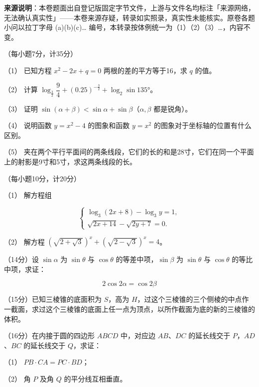 

\begin{gktip}
\textbf{来源说明}：本卷题面出自登记版固定字节文件，上游与文件名均标注「来源网络，无法确认真实性」——本卷来源存疑，转录如实照录，真实性未能核实。原卷各题小问以拉丁字母 (a)(b)(c)… 编号，本转录按体例统一为（1）（2）（3）…，内容不变。
\end{gktip}

\begin{question}
（每小题7分，计35分）

（1） 已知方程 $x^2-2x+q=0$ 两根的差的平方等于16，求 $q$ 的值。

（2） 计算 $\log_{\frac32}\dfrac94+(0.25)^{-\frac32}+\log_2\sin135°$。

（3） 证明 $\sin(\alpha+\beta)<\sin\alpha+\sin\beta$（$\alpha,\beta$ 都是锐角）。

（4） 说明函数 $y=x^2-4$ 的图象和函数 $y=x^2$ 的图象对于坐标轴的位置有什么区别。

（5） 夹在两个平行平面间的两条线段，它们的长的和是28寸，它们在同一个平面上的射影是9寸和5寸，求这两条线段的长。

\end{question}
\begin{question}
（每小题10分，计20分）

（1） 解方程组

\nopagebreak[4]
\[
\begin{cases}
\log_3(2x+8)-\log_3 y=1,\\
\sqrt{2x+14}-\sqrt{2y+7}=0.
\end{cases}
\]

（2） 解方程 $\left(\sqrt{2+\sqrt3}\right)^x+\left(\sqrt{2-\sqrt3}\right)^x=4$。

\end{question}
\begin{question}
（14分）设 $\sin\alpha$ 为 $\sin\theta$ 与 $\cos\theta$ 的等差中项，$\sin\beta$ 为 $\sin\theta$ 与 $\cos\theta$ 的等比中项，求证：

\nopagebreak[4]
\[
2\cos2\alpha=\cos2\beta
\]

\end{question}
\begin{question}
（15分）已知三棱锥的底面积为 $S$，高为 $H$，过这个三棱锥的三个侧棱的中点作一截面，求过这个三棱锥的底面上任一点为顶点，以所作截面为底的新的三棱锥的体积。

\end{question}
\begin{question}
（16分）在内接于圆的四边形 $ABCD$ 中，对应边 $AB$、$DC$ 的延长线交于 $P$，$AD$、$BC$ 的延长线交于 $Q$，求证：

（1） $PB\cdot CA=PC\cdot BD$；

（2） 角 $P$ 及角 $Q$ 的平分线互相垂直。

\end{question}